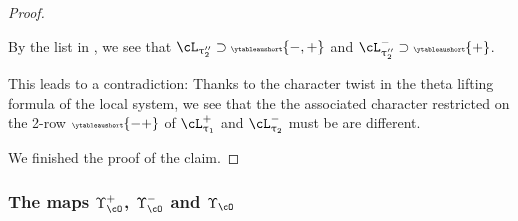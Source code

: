 \documentclass[12pt,a4paper]{amsart}
\def\abs#1{\left|{#1}\right|}
\def\DD{\nabla}
\numberwithin{equation}{section}
\theoremstyle{remark}
\def\ssign{\mathrm{Sign}}
\let\ytb=\ytableaushort
\newcommand{\tytb}[1]{{\tiny\ytb{#1}}}
\def\cOpp{\cO^{\prime\prime}}
\def\pUpsilon{\Upsilon^+}
\def\nUpsilon{\Upsilon^-}
\def\pcL{\cL^+}
\def\ncL{\cL^-}
\def\ncE{\cE^-}
\def\uptaup{\uptau^{\prime}}
\def\uptaupp{\uptau^{\prime\prime}}
\begin{document}
\begin{proof}
\begin{enumPF}
\begin{enumPF}
    By the list in , we see that
    $\cL_{\uptaupp_{2}}\supset \tytb{-,+}$ and
    $\ncL_{\uptaupp_{2}}\supset \tytb{+}$.

    This leads to a contradiction: Thanks to the character twist in the theta
    lifting formula of the local system, we see that the the associated
    character restricted on the 2-row $\tytb{-+}$ of $\pcL_{\uptau_{1}}$ and
    $\ncL_{\uptau_{2}}$ must be are different.

  \end{enumPF}
\end{enumPF}
  We finished the proof of the claim.
\end{proof}

\subsubsection{The maps $\pUpsilon_{\cO}$, $\nUpsilon_{\cO}$ and $\Upsilon_{\cO}$}
\end{document}

